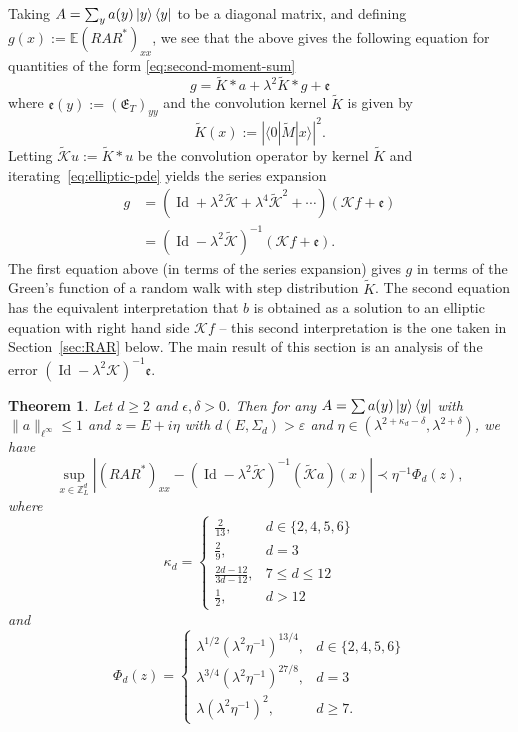 \documentclass[11pt]{amsart}
\def\Z{{\mathbb{Z}}}
\def\Expec{{\mathbb E}}
\def\eps{{\varepsilon}}
\newcommand{\Id}{{\operatorname*{Id}}}
\def\bra#1{\mathinner{\langle{#1}|}}
\def\ket#1{\mathinner{|{#1}\rangle}}
\def\Braket#1{\langle{#1}\rangle}
\newcommand{\mcal}[1]{{\mathcal{#1}}}
\newcommand{\ldom}{\prec}
\numberwithin{equation}{section}
\newtheorem{theorem}{Theorem}
\numberwithin{theorem}{section}
\begin{document}
Taking $A = \sum_y a(y)\ket{y}\bra{y}$
to be a diagonal matrix, and defining $g(x) := \Expec (RAR^*)_{xx}$,
we see that the above gives the following equation for quantities of the form \eqref{eq:second-moment-sum}
\begin{equation}
\label{eq:elliptic-pde}
g = \tilde{K} \ast a + \lambda^2 \tilde{K} \ast g + \mathfrak{e}
\end{equation}
where $\mathfrak{e}(y) := (\mathfrak{E}_T)_{yy}$ and the convolution kernel $\tilde{K}$ is given by
\begin{equation*}
\tilde{K}(x) := |\Braket{0| \tilde{M}|x}|^2.
\end{equation*}
Letting $\tilde{\mcal{K}} u := \tilde{K}\ast u$ be the convolution operator by kernel $\tilde{K}$ and
iterating~\eqref{eq:elliptic-pde} yields the series expansion
\begin{equation}
\label{eq:b-eq}
\begin{aligned}
g &= (\Id + \lambda^2 \tilde{\mcal{K}} + \lambda^4 \tilde{\mcal{K}}^2 + \cdots ) (\mcal{K} f + \mathfrak{e}) \\
&= (\Id - \lambda^2\tilde{\mcal{K}})^{-1} (\mcal{K}f + \mathfrak{e}).
\end{aligned}
\end{equation}
The first equation above (in terms of the series expansion) gives $g$ in terms of the Green's function
of a random walk with step distribution $\tilde{K}$.  The second equation has the equivalent interpretation that $b$ is obtained as a solution to an elliptic equation with right hand side $\mcal{K}f$ -- this second interpretation is the one taken in Section~\ref{sec:RAR} below.
The main result of this section is an analysis of the error $(\Id-\lambda^2\mcal{K})^{-1}\mathfrak{e}$.
\begin{theorem}
\label{thm:diffusive-profile}
Let $d\geq 2$ and $\epsilon,\delta>0$. Then for any $A = \sum a(y)\ket{y}\bra{y}$ with $\|a\|_{\ell^\infty}\leq 1$
and $z=E+i\eta$ with $d(E,\Sigma_d)>\eps$ and $\eta\in(\lambda^{2+\kappa_d-\delta} ,\lambda^{2+\delta})$,
we have
\begin{equation}
\label{eq:RAR-flucs}
\sup_{x\in\Z^d_L}|(RAR^*)_{xx} - (\Id -\lambda^2 \tilde{\mcal{K}})^{-1} (\tilde{\mcal{K}}a)(x)| \ldom \eta^{-1} \Phi_d(z),
\end{equation}
where
\[
\kappa_d = \begin{cases}
\frac{2}{13}, &d\in\{2,4,5,6\} \\
\frac{2}{9}, & d=3 \\
\frac{2d-12}{3d-12}, & 7\leq d\leq 12 \\
\frac12, &d>12
\end{cases}
\]
and
\[
\Phi_d(z) =
\begin{cases}
\lambda^{1/2}(\lambda^2\eta^{-1})^{13/4}, &d\in\{2,4,5,6\} \\
\lambda^{3/4}(\lambda^2\eta^{-1})^{27/8}, &d= 3\\
\lambda(\lambda^2\eta^{-1})^2, &d\geq 7.
\end{cases}
\]
\end{theorem}
\end{document}
